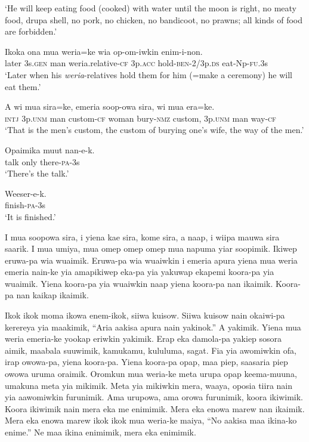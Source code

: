 \glt ‘He will keep eating food (cooked) with water until the moon is right, no meaty food, drupa shell, no pork, no chicken, no bandicoot, no prawns; all kinds of food are forbidden.’ \\
\z


\ea
\gll  Ikoka  ona  mua  weria=ke  wia  op-om-iwkin  enim-i-non. \\
later  3s.\textsc{gen}  man  weria.relative-\textsc{cf}  3p.\textsc{acc}  hold-\textsc{ben}-2/3p.\textsc{ds}  eat-Np-\textsc{fu}.3s \\
\glt ‘Later when his \textit{weria}{}-relatives hold them for him (=make a ceremony) he will eat them.’ \\
\z


\ea
\gll  A  wi  mua  sira=ke,  emeria  soop-owa  sira,  wi  mua        era=ke. \\
\textsc{intj}  3p.\textsc{unm}  man  custom-\textsc{cf}  woman  bury-\textsc{nmz}  custom,  3p.\textsc{unm}  man way-\textsc{cf} \\


\glt ‘That is the men’s custom, the custom of burying one’s wife, the way of the men.’ \\
\z


\ea
\gll  Opaimika  muut  nan-e-k. \\
talk  only  there-\textsc{pa}-3s \\
\glt ‘There’s the talk.’ \\
\z


\ea
\gll  Weeser-e-k. \\
finish-\textsc{pa}-3s \\
\glt ‘It is finished.’ \\
\z

I mua soopowa sira, i yiena kae sira, kome sira, a naap, i wiipa mauwa sira saarik. 
I mua umiya, mua omep omep omep mua napuma yiar soopimik.
Ikiwep eruwa-pa wia wuaimik. 
Eruwa-pa wia wuaiwkin i emeria apura yiena mua weria emeria nain-ke yia amapikiwep eka-pa yia yakuwap ekapemi koora-pa yia wuaimik. 
Yiena koora-pa yia wuaiwkin naap yiena koora-pa nan ikaimik. 
Koora-pa nan kaikap ikaimik.

Ikok ikok moma ikowa enem-ikok, siiwa kuisow. 
Siiwa kuisow nain okaiwi-pa kerereya yia maakimik, “Aria aakisa apura nain yakinok.” 
A yakimik. Yiena mua weria emeria-ke yookap eriwkin yakimik. 
Erap eka damola-pa yakiep sosora aimik, maabala suuwimik, kamukamu, kululuma, sagat. 
Fia yia awomiwkin ofa, irap owowa-pa, yiena koora-pa. 
Yiena koora-pa opap, maa piep, saasaria piep owowa uruma oraimik. 
Oromkun mua weria-ke meta urupa opap keema-muuna, umakuna meta yia mikimik.
Meta yia mikiwkin mera, waaya, oposia tiira nain yia aawomiwkin furunimik. 
Ama urupowa, ama orowa furunimik, koora ikiwimik. 
Koora ikiwimik nain mera eka me enimimik. 
Mera eka enowa marew nan ikaimik.
Mera eka enowa marew ikok ikok mua weria-ke maiya, “No aakisa maa ikina-ko enime.” 
Ne maa ikina enimimik, mera eka enimimik.

